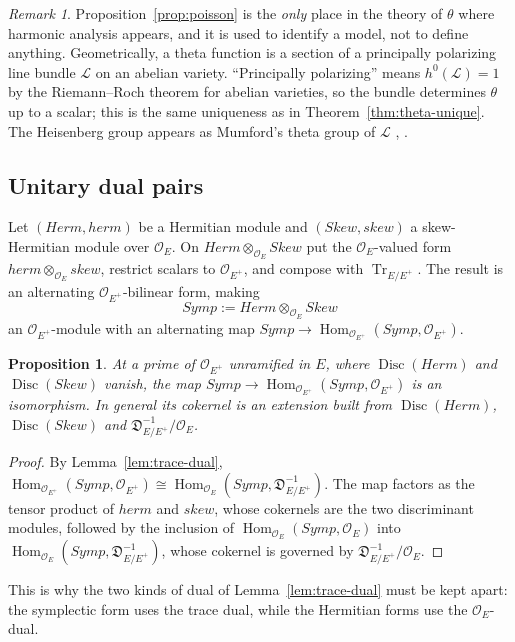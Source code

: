 \documentclass[11pt]{amsart}
\newtheorem{proposition}[theorem]{Proposition}
\theoremstyle{definition}
\theoremstyle{remark}
\newtheorem{remark}[theorem]{Remark}
\newcommand{\OEring}{\mathcal{O}_E}
\newcommand{\OEp}{\mathcal{O}_{E^+}}
\newcommand{\herm}{\mathit{herm}}
\newcommand{\Herm}{\mathit{Herm}}
\newcommand{\Skew}{\mathit{Skew}}
\newcommand{\Symp}{\mathit{Symp}}
\DeclareMathOperator{\Hom}{Hom}
\DeclareMathOperator{\Disc}{Disc}
\DeclareMathOperator{\Tr}{Tr}
\newcommand{\Diff}{\mathfrak{D}_{E/E^+}}
\begin{document}
\begin{remark}
Proposition~\ref{prop:poisson} is the \emph{only} place in the theory of $\theta$ where harmonic analysis appears, and it is used to identify a model, not to define anything. Geometrically, a theta function is a section of a principally polarizing line bundle $\mathcal L$ on an abelian variety. ``Principally polarizing'' means $h^0(\mathcal L)=1$ by the Riemann--Roch theorem for abelian varieties, so the bundle determines $\theta$ up to a scalar; this is the same uniqueness as in Theorem~\ref{thm:theta-unique}. The Heisenberg group appears as Mumford's theta group of $\mathcal L$ \cite{Mumford-eq}, \cite{nLab-theta}.
\end{remark}

\subsection{Unitary dual pairs}\label{subsec:dualpair}
Let $(\Herm,\herm)$ be a Hermitian module and $(\Skew,\mathit{skew})$ a skew-Hermitian module over $\OEring$. On $\Herm\otimes_{\OEring}\Skew$ put the $\OEring$-valued form $\herm\otimes_{\OEring}\mathit{skew}$, restrict scalars to $\OEp$, and compose with $\Tr_{E/E^+}$. The result is an alternating $\OEp$-bilinear form, making
\[
\Symp:=\Herm\otimes_{\OEring}\Skew
\]
an $\OEp$-module with an alternating map $\Symp\to\Hom_{\OEp}(\Symp,\OEp)$.

\begin{proposition}\label{prop:symp-selfdual}
At a prime of $\OEp$ unramified in $E$, where $\Disc(\Herm)$ and $\Disc(\Skew)$ vanish, the map $\Symp\to\Hom_{\OEp}(\Symp,\OEp)$ is an isomorphism. In general its cokernel is an extension built from $\Disc(\Herm)$, $\Disc(\Skew)$ and $\Diff^{-1}/\OEring$.
\end{proposition}

\begin{proof}
By Lemma~\ref{lem:trace-dual}, $\Hom_{\OEp}(\Symp,\OEp)\cong\Hom_{\OEring}(\Symp,\Diff^{-1})$. The map factors as the tensor product of $\herm$ and $\mathit{skew}$, whose cokernels are the two discriminant modules, followed by the inclusion of $\Hom_{\OEring}(\Symp,\OEring)$ into $\Hom_{\OEring}(\Symp,\Diff^{-1})$, whose cokernel is governed by $\Diff^{-1}/\OEring$.
\end{proof}

This is why the two kinds of dual of Lemma~\ref{lem:trace-dual} must be kept apart: the symplectic form uses the trace dual, while the Hermitian forms use the $\OEring$-dual.
\end{document}
